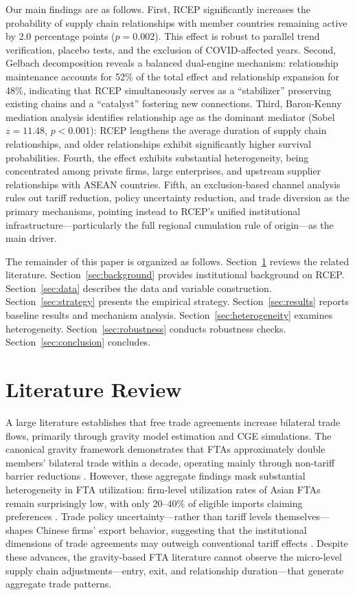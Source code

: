 \documentclass[preprint,12pt,authoryear]{elsarticle}
\begin{document}
Our main findings are as follows. First, RCEP significantly increases the probability of supply chain relationships with member countries remaining active by 2.0 percentage points ($p=0.002$). This effect is robust to parallel trend verification, placebo tests, and the exclusion of COVID-affected years. Second, Gelbach decomposition reveals a balanced dual-engine mechanism: relationship maintenance accounts for 52\% of the total effect and relationship expansion for 48\%, indicating that RCEP simultaneously serves as a ``stabilizer'' preserving existing chains and a ``catalyst'' fostering new connections. Third, Baron-Kenny mediation analysis identifies relationship age as the dominant mediator (Sobel $z=11.48$, $p<0.001$): RCEP lengthens the average duration of supply chain relationships, and older relationships exhibit significantly higher survival probabilities. Fourth, the effect exhibits substantial heterogeneity, being concentrated among private firms, large enterprises, and upstream supplier relationships with ASEAN countries. Fifth, an exclusion-based channel analysis rules out tariff reduction, policy uncertainty reduction, and trade diversion as the primary mechanisms, pointing instead to RCEP's unified institutional infrastructure---particularly the full regional cumulation rule of origin---as the main driver.

The remainder of this paper is organized as follows. Section~\ref{sec:literature} reviews the related literature. Section~\ref{sec:background} provides institutional background on RCEP. Section~\ref{sec:data} describes the data and variable construction. Section~\ref{sec:strategy} presents the empirical strategy. Section~\ref{sec:results} reports baseline results and mechanism analysis. Section~\ref{sec:heterogeneity} examines heterogeneity. Section~\ref{sec:robustness} conducts robustness checks. Section~\ref{sec:conclusion} concludes.

\section{Literature Review}
\label{sec:literature}

A large literature establishes that free trade agreements increase bilateral trade flows, primarily through gravity model estimation and CGE simulations. The canonical gravity framework demonstrates that FTAs approximately double members' bilateral trade within a decade, operating mainly through non-tariff barrier reductions \citep{baier2019gravity}. However, these aggregate findings mask substantial heterogeneity in FTA utilization: firm-level utilization rates of Asian FTAs remain surprisingly low, with only 20--40\% of eligible imports claiming preferences \citep{hayakawa2023firm}. Trade policy uncertainty---rather than tariff levels themselves---shapes Chinese firms' export behavior, suggesting that the institutional dimensions of trade agreements may outweigh conventional tariff effects \citep{zhou2022trade}. Despite these advances, the gravity-based FTA literature cannot observe the micro-level supply chain adjustments---entry, exit, and relationship duration---that generate aggregate trade patterns.
\end{document}
